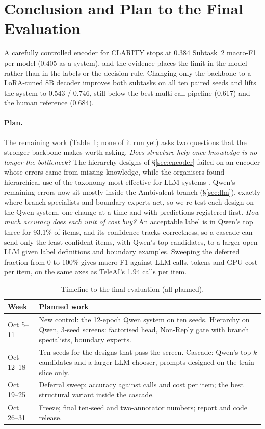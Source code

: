 \section{Conclusion and Plan to the Final Evaluation}
\label{sec:conclusion}

A carefully controlled encoder for CLARITY stops at 0.384 Subtask~2 macro-F1 per model (0.405 as a system), and the evidence places the limit in the model rather than in the labels or the decision rule.
Changing only the backbone to a LoRA-tuned 8B decoder improves both subtasks on all ten paired seeds and lifts the system to 0.543 / 0.746, still below the best multi-call pipeline (0.617) and the human reference (0.684).

\paragraph{Plan.}
The remaining work (Table~\ref{tab:timeline}; none of it run yet) asks two questions that the stronger backbone makes worth asking.
\emph{Does structure help once knowledge is no longer the bottleneck?}
The hierarchy designs of \S\ref{sec:encoder} failed on an encoder whose errors came from missing knowledge, while the organisers found hierarchical use of the taxonomy most effective for LLM systems \citep{thomas-etal-2026-semeval}.
Qwen's remaining errors now sit mostly inside the Ambivalent branch (\S\ref{sec:llm}), exactly where branch specialists and boundary experts act, so we re-test each design on the Qwen system, one change at a time and with predictions registered first.
\emph{How much accuracy does each unit of cost buy?}
An acceptable label is in Qwen's top three for 93.1\% of items, and its confidence tracks correctness, so a cascade can send only the least-confident items, with Qwen's top candidates, to a larger open LLM given label definitions and boundary examples.
Sweeping the deferred fraction from 0 to 100\% gives macro-F1 against LLM calls, tokens and GPU cost per item, on the same axes as TeleAI's 1.94 calls per item.

\begin{table}[t]
\centering
\small
\begin{tabular}{@{}lp{}@{}}
\toprule
Week & Planned work \\
\midrule
Oct 5--11 & New control: the 12-epoch Qwen system on ten seeds. Hierarchy on Qwen, 3-seed screens: factorised head, Non-Reply gate with branch specialists, boundary experts. \\
Oct 12--18 & Ten seeds for the designs that pass the screen. Cascade: Qwen's top-$k$ candidates and a larger LLM chooser, prompts designed on the train slice only. \\
Oct 19--25 & Deferral sweep: accuracy against calls and cost per item; the best structural variant inside the cascade. \\
Oct 26--31 & Freeze; final ten-seed and two-annotator numbers; report and code release. \\
\bottomrule
\end{tabular}
\caption{Timeline to the final evaluation (all planned).}
\label{tab:timeline}
\end{table}
